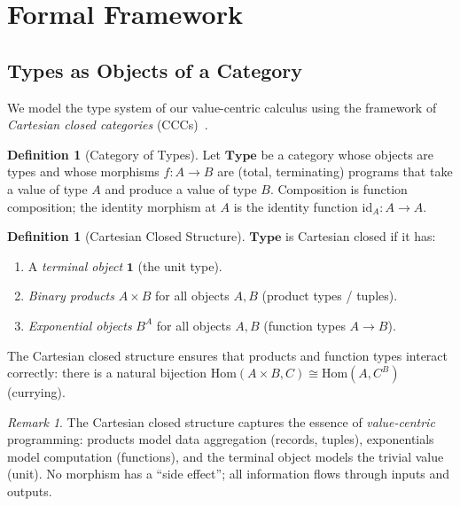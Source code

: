 \documentclass[11pt]{article}
\theoremstyle{definition}
\newtheorem{definition}[theorem]{Definition}
\theoremstyle{remark}
\newtheorem{remark}[theorem]{Remark}
\newcommand{\Type}{\mathbf{Type}}
\newcommand{\Hom}{\mathrm{Hom}}
\newcommand{\id}{\mathrm{id}}
\begin{document}
\section{Formal Framework}
\label{sec:formal}

\subsection{Types as Objects of a Category}

We model the type system of our value-centric calculus using the
framework of \emph{Cartesian closed categories}
(CCCs)~\cite{lambek1986introduction,barr1990category}.

\begin{definition}[Category of Types]
\label{def:type-category}
Let $\Type$ be a category whose objects are types and whose morphisms
$f : A \to B$ are (total, terminating) programs that take a value of
type $A$ and produce a value of type $B$.  Composition is function
composition; the identity morphism at $A$ is the identity function
$\id_A : A \to A$.
\end{definition}

\begin{definition}[Cartesian Closed Structure]
\label{def:ccc}
$\Type$ is Cartesian closed if it has:
\begin{enumerate}
  \item A \emph{terminal object} $\mathbf{1}$ (the unit type).
  \item \emph{Binary products} $A \times B$ for all objects $A, B$
    (product types / tuples).
  \item \emph{Exponential objects} $B^A$ for all objects $A, B$
    (function types $A \to B$).
\end{enumerate}
The Cartesian closed structure ensures that products and function
types interact correctly: there is a natural bijection
$\Hom(A \times B, C) \cong \Hom(A, C^B)$ (currying).
\end{definition}

\begin{remark}
The Cartesian closed structure captures the essence of
\emph{value-centric} programming: products model data aggregation
(records, tuples), exponentials model computation (functions), and the
terminal object models the trivial value (unit).  No morphism has a
``side effect''; all information flows through inputs and outputs.
\end{remark}
\end{document}

